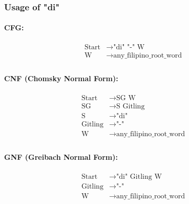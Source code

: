 \subsubsection{Usage of "di"}

\paragraph{CFG:}

\begin{equation*}
    \begin{aligned}
        \text{Start}  & \rightarrow \text{"di" "-" W}   \\
        \text{W} & \rightarrow \text{any\_filipino\_root\_word}   \\
    \end{aligned}
\end{equation*}

\paragraph{CNF (Chomsky Normal Form):}

\begin{equation*}
    \begin{aligned}
        \text{Start}   & \rightarrow \text{SG W} \\
        \text{SG}      & \rightarrow \text{S Gitling}\\
        \text{S}    & \rightarrow \text{"di"}\\        
        \text{Gitling} & \rightarrow \text{"-"}\\
        \text{W} & \rightarrow \text{any\_filipino\_root\_word}   \\
    \end{aligned}
\end{equation*}

\paragraph{GNF (Greibach Normal Form):}

\begin{equation*}
    \begin{aligned}
        \text{Start}   & \rightarrow \text{"di" Gitling W}\\
        \text{Gitling} & \rightarrow \text{"-"}\\
        \text{W} & \rightarrow \text{any\_filipino\_root\_word}   \\
    \end{aligned}
\end{equation*}

